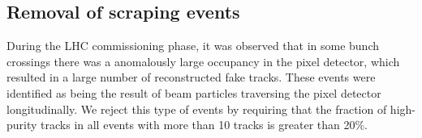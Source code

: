 

\subsection{Removal of scraping events}

During the LHC commissioning phase, it was observed that
in some bunch crossings there was a anomalously large occupancy in the
pixel detector, which resulted in a large number of reconstructed fake
tracks. These events were identified as being the result of beam
particles traversing the pixel detector longitudinally. We reject this
type of events by requiring that the fraction of high-purity tracks in
all events with more than 10 tracks is greater than 20\%.

